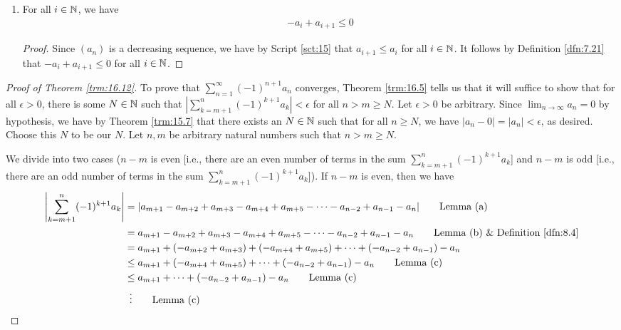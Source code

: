 \documentclass[../main.tex]{subfiles}
\begin{document}
\begin{theorem}
\begin{lemma*}
\begin{enumerate}[label={\textup{(}\alph*\textup{)}}]
\begin{proof}
            \end{proof}
            \item For all $i\in\mathbb{N}$, we have
            \begin{align*}
                -a_i+a_{i+1} \leq 0
            \end{align*}
            \begin{proof}
                Since $(a_n)$ is a decreasing sequence, we have by Script \ref{sct:15} that $a_{i+1}\leq a_i$ for all $i\in\mathbb{N}$. It follows by Definition \ref{dfn:7.21} that $-a_i+a_{i+1}\leq 0$ for all $i\in\mathbb{N}$.
            \end{proof}
        \end{enumerate}
    \end{lemma*}
    \begin{proof}[Proof of Theorem \ref{trm:16.12}]
        To prove that $\sum_{n=1}^\infty(-1)^{n+1}a_n$ converges, Theorem \ref{trm:16.5} tells us that it will suffice to show that for all $\epsilon>0$, there is some $N\in\mathbb{N}$ such that $|\sum_{k=m+1}^n(-1)^{k+1}a_k|<\epsilon$ for all $n>m\geq N$. Let $\epsilon>0$ be arbitrary. Since $\lim_{n\to\infty}a_n=0$ by hypothesis, we have by Theorem \ref{trm:15.7} that there exists an $N\in\mathbb{N}$ such that for all $n\geq N$, we have $|a_n-0|=|a_n|<\epsilon$, as desired. Choose this $N$ to be our $N$. Let $n,m$ be arbitrary natural numbers such that $n>m\geq N$.\par
        We divide into two cases ($n-m$ is even [i.e., there are an even number of terms in the sum $\sum_{k=m+1}^n(-1)^{k+1}a_k$] and $n-m$ is odd [i.e., there are an odd number of terms in the sum $\sum_{k=m+1}^n(-1)^{k+1}a_k$]). If $n-m$ is even, then we have
        \begin{align*}
            \left| \sum_{k=m+1}^n(-1)^{k+1}a_k \right| &= |a_{m+1}-a_{m+2}+a_{m+3}-a_{m+4}+a_{m+5}-\cdots-a_{n-2}+a_{n-1}-a_n|\tag*{Lemma (a)}\\
            &= a_{m+1}-a_{m+2}+a_{m+3}-a_{m+4}+a_{m+5}-\cdots-a_{n-2}+a_{n-1}-a_n\tag*{Lemma (b) \& Definition \ref{dfn:8.4}}\\
            &= a_{m+1}+(-a_{m+2}+a_{m+3})+(-a_{m+4}+a_{m+5})+\cdots+(-a_{n-2}+a_{n-1})-a_n\\
            &\leq a_{m+1}+(-a_{m+4}+a_{m+5})+\cdots+(-a_{n-2}+a_{n-1})-a_n\tag*{Lemma (c)}\\
            &\leq a_{m+1}+\cdots+(-a_{n-2}+a_{n-1})-a_n\tag*{Lemma (c)}\\
            &\hspace{5pt}\vdots\tag*{Lemma (c)}\\

\end{align*}
\end{proof}
\end{theorem}
\end{document}
